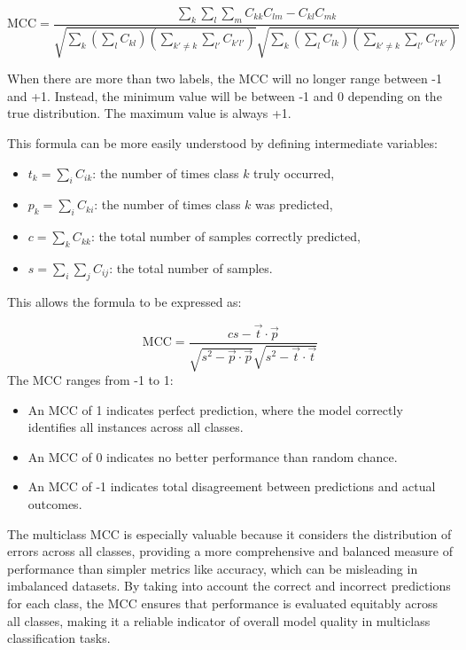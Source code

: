 \[
\text{MCC} = \frac{\sum_k \sum_l \sum_m C_{kk} C_{lm} - C_{kl} C_{mk}}{\sqrt{\sum_k \left( \sum_l C_{kl} \right) \left( \sum_{k' \ne k} \sum_{l'} C_{k'l'} \right)} \sqrt{\sum_k \left( \sum_l C_{lk} \right) \left( \sum_{k' \ne k} \sum_{l'} C_{l'k'} \right)}}
\]

When there are more than two labels, the MCC will no longer range between -1 and +1. Instead, the minimum value will be between -1 and 0 depending on the true distribution. The maximum value is always +1.

This formula can be more easily understood by defining intermediate variables:

\begin{itemize}
    \item $t_k = \sum_i C_{ik}$: the number of times class $k$ truly occurred,
    \item $p_k = \sum_i C_{ki}$: the number of times class $k$ was predicted,
    \item $c = \sum_k C_{kk}$: the total number of samples correctly predicted,
    \item $s = \sum_i \sum_j C_{ij}$: the total number of samples.
\end{itemize}

This allows the formula to be expressed as:

\[
\text{MCC} = \frac{cs - \vec{t} \cdot \vec{p}}{\sqrt{s^2 - \vec{p} \cdot \vec{p}} \sqrt{s^2 - \vec{t} \cdot \vec{t}}}
\]
\noindent
The MCC ranges from -1 to 1:
\begin{itemize}
    \item An MCC of 1 indicates perfect prediction, where the model correctly identifies all instances across all classes.
    \item An MCC of 0 indicates no better performance than random chance.
    \item An MCC of -1 indicates total disagreement between predictions and actual outcomes.
\end{itemize}
\noindent
The multiclass MCC is especially valuable because it considers the distribution of errors across all classes, providing a more comprehensive
and balanced measure of performance than simpler metrics like accuracy, which can be misleading in imbalanced datasets.
By taking into account the correct and incorrect predictions for each class, the MCC ensures that performance is evaluated equitably across all classes,
making it a reliable indicator of overall model quality in multiclass classification tasks.

